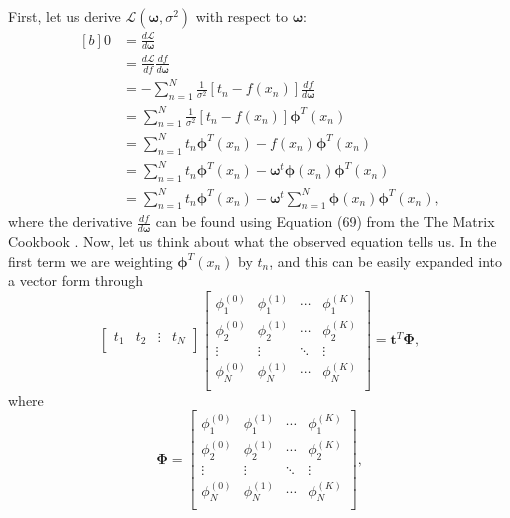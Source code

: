\documentclass{article}
\begin{document}
First, let us derive $\mathcal{L}(\boldsymbol\omega, \sigma^2)$ with respect to $\boldsymbol\omega$:
\begin{equation}\label{eq:partial_ML_regression}
\begin{aligned}[b]
0 &= \frac{d\mathcal{L}}{d\boldsymbol\omega} \\
&= \frac{d\mathcal{L}}{df} \frac{df}{d\boldsymbol\omega} \\
&= -\sum_{n=1}^{N}\frac{1}{\sigma^2} \left[ t_n - f(x_n) \right] \frac{df}{d\boldsymbol\omega}  \\
&= \sum_{n=1}^{N}\frac{1}{\sigma^2} \left[ t_n - f(x_n) \right]\boldsymbol\phi^T(x_n)\\
&= \sum_{n=1}^{N} t_n \boldsymbol\phi^T(x_n) - f(x_n) \boldsymbol\phi^T(x_n) \\
&= \sum_{n=1}^{N} t_n \boldsymbol\phi^T(x_n) - \boldsymbol\omega^t \boldsymbol\phi(x_n) \boldsymbol\phi^T(x_n) \\
&= \sum_{n=1}^{N} t_n \boldsymbol\phi^T(x_n) - \boldsymbol\omega^t \sum_{n=1}^{N} \boldsymbol\phi(x_n) \boldsymbol\phi^T(x_n),
\end{aligned}
\end{equation}
where the derivative $\frac{df}{d\boldsymbol\omega}$ can be found using Equation (69) from the The Matrix Cookbook \cite{Petersen2006TheMC}. Now, let us think about what the observed equation tells us. In the first term we are weighting  $\boldsymbol\phi^T(x_n)$ by $t_n$, and this can be easily expanded into a vector form through
\begin{equation}
\begin{bmatrix}
t_1  & t_2  & \vdots & t_N \\
\end{bmatrix}
\begin{bmatrix}
\phi_1^{(0)} & \phi_1^{(1)} & \cdots & \phi_1^{(K)} \\
\phi_2^{(0)} & \phi_2^{(1)} & \cdots & \phi_2^{(K)} \\
\vdots & \vdots & \ddots & \vdots \\
\phi_N^{(0)} & \phi_N^{(1)} & \cdots & \phi_N^{(K)} \\
\end{bmatrix}
= \mathbf{t}^T\boldsymbol\Phi,
\end{equation}
where 
\begin{equation}\label{eq:Phi_matrix}
\boldsymbol\Phi = 
\begin{bmatrix}
\phi_1^{(0)} & \phi_1^{(1)} & \cdots & \phi_1^{(K)} \\
\phi_2^{(0)} & \phi_2^{(1)} & \cdots & \phi_2^{(K)} \\
\vdots & \vdots & \ddots & \vdots \\
\phi_N^{(0)} & \phi_N^{(1)} & \cdots & \phi_N^{(K)} \\
\end{bmatrix},
\end{equation}
\end{document}
